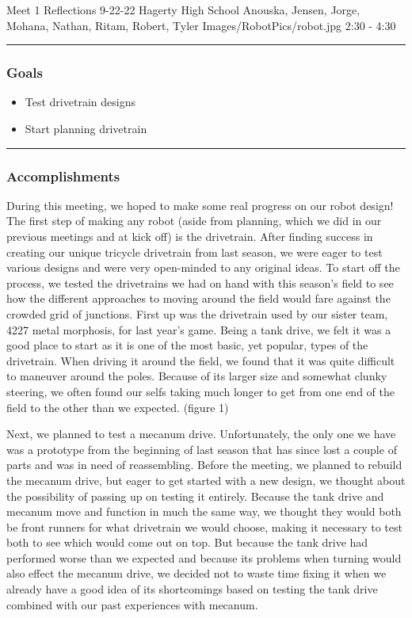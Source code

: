 \insertmeeting 
	{Meet 1 Reflections} 
	{9-22-22} 
	{Hagerty High School}
	{Anouska, Jensen, Jorge, Mohana, Nathan, Ritam, Robert, Tyler}
	{Images/RobotPics/robot.jpg}
	{2:30 - 4:30}
	
\noindent\hfil\rule{\textwidth}{.4pt}\hfil
\subsubsection*{Goals}
\begin{itemize}
    \item Test drivetrain designs
    \item Start planning drivetrain



\end{itemize} 

\noindent\hfil\rule{\textwidth}{.4pt}\hfil

\subsubsection*{Accomplishments}
During this meeting, we hoped to make some real progress on our robot design! The first step of making any robot (aside from planning, which we did in our previous meetings and at kick off) is the drivetrain. After finding success in creating our unique tricycle drivetrain from last season, we were eager to test various designs and were very open-minded to any original ideas. 
To start off the process, we tested the drivetrains we had on hand with this season's field to see how the different approaches to moving around the field would fare against the crowded grid of junctions. First up was the drivetrain used by our sister team, 4227 metal morphosis, for last year's game. Being a tank drive, we felt it was a good place to start as it is one of the most basic, yet popular, types of the drivetrain. When driving it around the field, we found that it was quite difficult to maneuver around the poles. Because of its larger size and somewhat clunky steering, we often found our selfs taking much longer to get from one end of the field to the other than we expected. (figure 1)

Next, we planned to test a mecanum drive. Unfortunately, the only one we have was a prototype from the beginning of last season that has since lost a couple of parts and was in need of reassembling. Before the meeting, we planned to rebuild the mecanum drive, but eager to get started with a new design, we thought about the possibility of passing up on testing it entirely. Because the tank drive and mecanum move and function in much the same way, we thought they would both be front runners for what drivetrain we would choose, making it necessary to test both to see which would come out on top. But because the tank drive had performed worse than we expected and because its problems when turning would also effect the mecanum drive, we decided not to waste time fixing it when we already have a good idea of its shortcomings based on testing the tank drive combined with our past experiences with mecanum.

